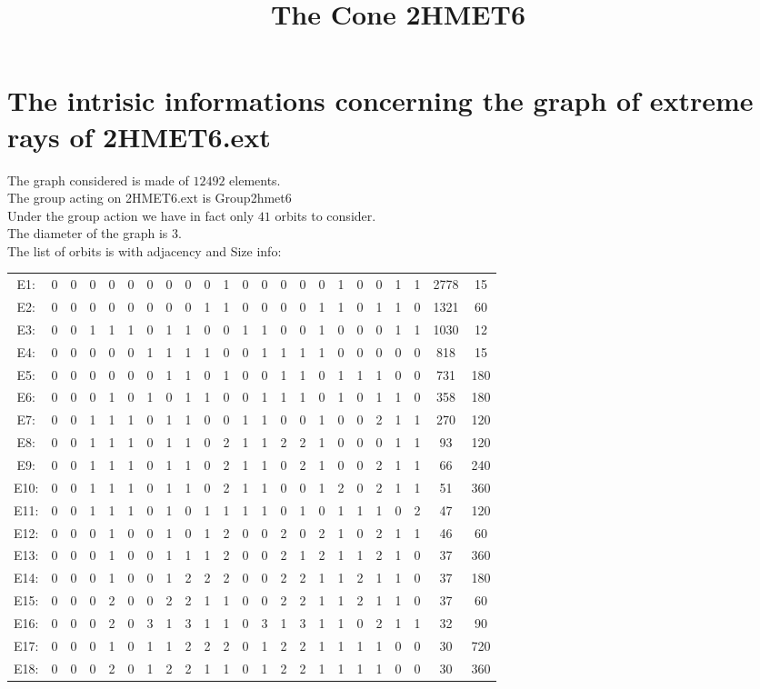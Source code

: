 \documentclass[12pt]{article}
\title{The Cone 2HMET6}
\begin{document}
\maketitle
\section{The intrisic informations concerning the graph of extreme rays of 2HMET6.ext}
The graph considered is made of $12492$ elements.\\
The group acting on 2HMET6.ext is Group2hmet6\\
Under the group action we have in fact only $41$ orbits to consider.\\
The diameter of the graph is $3$.\\
The list of orbits is with adjacency and Size info:
\begin{center}
\scriptsize
\begin{tabular}{ccccccccccccccccccccc|c|c}
E1:&0&0&0&0&0&0&0&0&0&1&0&0&0&0&0&1&0&0&1&1&2778&15\\
E2:&0&0&0&0&0&0&0&0&1&1&0&0&0&0&1&1&0&1&1&0&1321&60\\
E3:&0&0&1&1&1&0&1&1&0&0&1&1&0&0&1&0&0&0&1&1&1030&12\\
E4:&0&0&0&0&0&1&1&1&1&0&0&1&1&1&1&0&0&0&0&0&818&15\\
E5:&0&0&0&0&0&0&1&1&0&1&0&0&1&1&0&1&1&1&0&0&731&180\\
E6:&0&0&0&1&0&1&0&1&1&0&0&1&1&1&0&1&0&1&1&0&358&180\\
E7:&0&0&1&1&1&0&1&1&0&0&1&1&0&0&1&0&0&2&1&1&270&120\\
E8:&0&0&1&1&1&0&1&1&0&2&1&1&2&2&1&0&0&0&1&1&93&120\\
E9:&0&0&1&1&1&0&1&1&0&2&1&1&0&2&1&0&0&2&1&1&66&240\\
E10:&0&0&1&1&1&0&1&1&0&2&1&1&0&0&1&2&0&2&1&1&51&360\\
E11:&0&0&1&1&1&0&1&0&1&1&1&1&0&1&0&1&1&1&0&2&47&120\\
E12:&0&0&0&1&0&0&1&0&1&2&0&0&2&0&2&1&0&2&1&1&46&60\\
E13:&0&0&0&1&0&0&1&1&1&2&0&0&2&1&2&1&1&2&1&0&37&360\\
E14:&0&0&0&1&0&0&1&2&2&2&0&0&2&2&1&1&2&1&1&0&37&180\\
E15:&0&0&0&2&0&0&2&2&1&1&0&0&2&2&1&1&2&1&1&0&37&60\\
E16:&0&0&0&2&0&3&1&3&1&1&0&3&1&3&1&1&0&2&1&1&32&90\\
E17:&0&0&0&1&0&1&1&2&2&2&0&1&2&2&1&1&1&1&0&0&30&720\\
E18:&0&0&0&2&0&1&2&2&1&1&0&1&2&2&1&1&1&1&0&0&30&360\\

\end{tabular}
\end{center}
\end{document}
